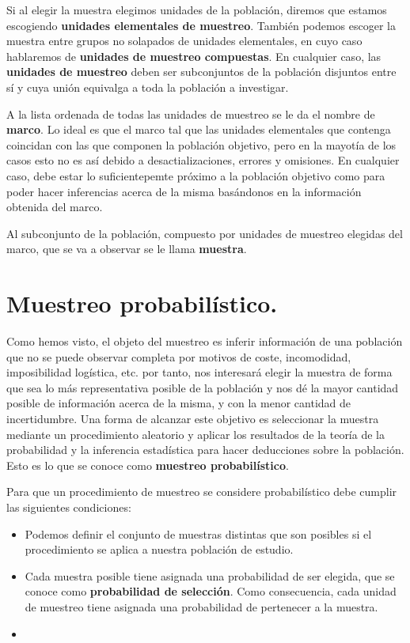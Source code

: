 Si al elegir la muestra elegimos unidades de la poblaci\'on, diremos que estamos escogiendo \textbf{unidades elementales de muestreo}. Tambi\'en podemos escoger la muestra entre grupos no solapados de unidades elementales, en cuyo caso hablaremos de \textbf{unidades de muestreo compuestas}. En cualquier caso, las\textbf{ unidades de muestreo} deben ser subconjuntos de la poblaci\'on disjuntos entre s\'i y cuya uni\'on equivalga a toda la poblaci\'on a investigar.

A la lista ordenada de todas las unidades de muestreo se le da el nombre de \textbf{marco}. Lo ideal es que el marco tal que las unidades elementales que contenga coincidan con las que componen la poblaci\'on objetivo, pero en la mayot\'ia de los casos esto no es as\'i debido a desactializaciones, errores y omisiones. En cualquier caso, debe estar lo suficientepemte pr\'oximo a la poblaci\'on objetivo como para poder hacer inferencias acerca de la misma bas\'andonos en la informaci\'on obtenida del marco.

Al subconjunto de la poblaci\'on, compuesto por unidades de muestreo elegidas del marco, que se va a observar se le llama \textbf{muestra}.

\section{Muestreo probabil\'istico.}

Como hemos visto, el objeto del muestreo es inferir informaci\'on de una poblaci\'on que no se puede observar completa por motivos de coste, incomodidad, imposibilidad log\'istica, etc. por tanto, nos interesar\'a elegir la muestra de forma que sea lo m\'as representativa posible de la poblaci\'on y nos d\'e la mayor cantidad posible de informaci\'on acerca de la misma, y con la menor cantidad de incertidumbre. Una forma de alcanzar este objetivo es seleccionar la muestra mediante un procedimiento aleatorio y aplicar los resultados de la teor\'ia de la probabilidad y la inferencia estad\'istica para hacer deducciones sobre la poblaci\'on. Esto es lo que se conoce como \textbf{muestreo probabil\'istico}.

Para que un procedimiento de muestreo se considere probabil\'istico debe cumplir las siguientes condiciones:

\begin{itemize}
	\item Podemos definir el conjunto de muestras distintas que son posibles si el procedimiento se aplica a nuestra poblaci\'on de estudio.
	\item Cada muestra posible tiene asignada una probabilidad de ser elegida, que se conoce como \textbf{probabilidad de selecci\'on}. Como consecuencia, cada unidad de muestreo tiene asignada una probabilidad de pertenecer a la muestra.
	\item 
\end{itemize}

